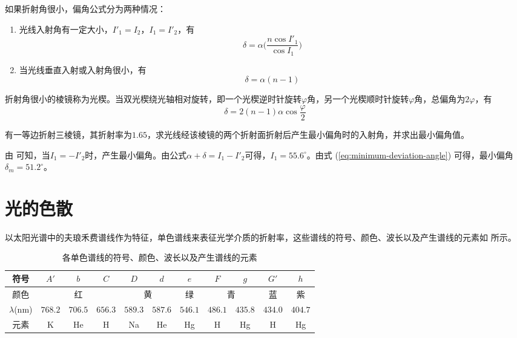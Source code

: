 \documentclass[cn,10pt,chinesefont=founder,math=newtx,cite=super,twoside]{elegantbook}
\begin{document}
如果折射角很小，偏角公式分为两种情况：
\begin{enumerate}
	\item 光线入射角有一定大小，$I'_1=I_2$，$I_1=I'_2$，有
	\begin{equation}
	\delta=\alpha\bigg(\frac{n\cos I'_1}{\cos I_1}\bigg)
	\end{equation}
	\item 当光线垂直入射或入射角很小，有
	\begin{equation}
	\delta=\alpha(n-1)
	\end{equation}
\end{enumerate}

折射角很小的棱镜称为光楔。当双光楔绕光轴相对旋转，即一个光楔逆时针旋转$\varphi$角，另一个光楔顺时针旋转$\varphi$角，总偏角为$2\varphi$，有
\begin{equation}
\delta=2(n-1)\alpha\cos\frac{\varphi}{2}
\end{equation}

\begin{problem}
	有一等边折射三棱镜，其折射率为$1.65$，求光线经该棱镜的两个折射面折射后产生最小偏角时的入射角，并求出最小偏角值。
\end{problem}
\begin{solution}
	由 可知，当$I_1=-I'_2$时，产生最小偏角。由公式$\alpha+\delta=I_1-I'_2$可得，$I_1=55.6^{\circ}$。由式 (\ref{eq:minimum-deviation-angle}) 可得，最小偏角$\delta_m=51.2^{\circ}$。
\end{solution}

\section{光的色散}
以太阳光谱中的夫琅禾费谱线作为特征，单色谱线来表征光学介质的折射率，这些谱线的符号、颜色、波长以及产生谱线的元素如 所示。

\begin{table}[htbp]
	\small
	\centering
	\caption{各单色谱线的符号、颜色、波长以及产生谱线的元素}
	\begin{tabular}{c|c|c|c|c|c|c|c|c|c|c}
		\hline
		符号&$A'$&$b$&$C$&$D$&$d$&$e$&$F$&$g$&$G'$&$h$\\
		\hline
		颜色&\multicolumn{3}{c|}{红}&\multicolumn{2}{c|}{黄}&绿&\multicolumn{2}{c|}{青}&蓝&紫\\
		\hline
		$\lambda$(nm)&$768.2$&$706.5$&$656.3$&$589.3$&$587.6$&$546.1$&$486.1$&$435.8$&$434.0$&$404.7$\\
		\hline
		元素&K&He&H&Na&He&Hg&H&Hg&H&Hg\\
		\hline
	\end{tabular}
	\label{tab:spectral-line}
\end{table}
\end{document}
